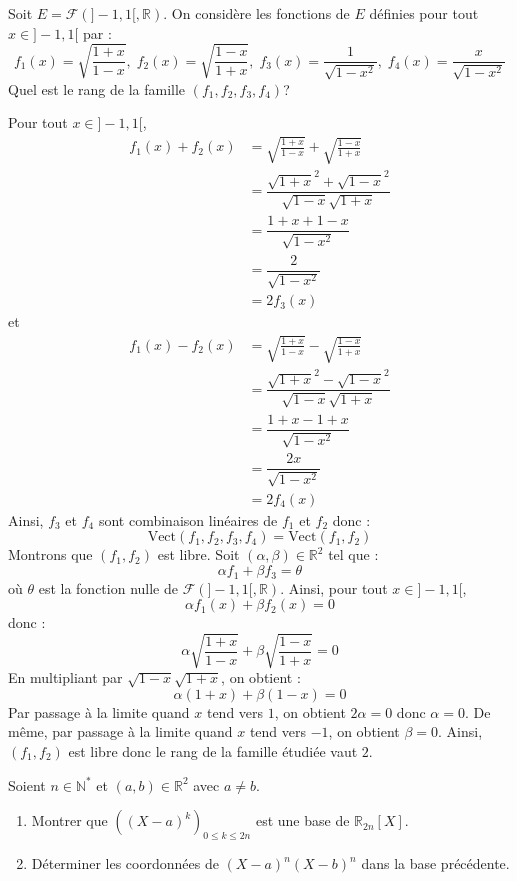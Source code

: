 \documentclass[a4paper,10pt]{report}
\begin{document}
\begin{Exercice}{} Soit $E = \mathcal{F}(]-1,1[, \mathbb{R})$. On considère les fonctions de $E$ définies pour tout $x \in ]-1,1[$ par : 
    \[
    f_1(x) = \sqrt {\frac{1 + x}{1 - x}} , \; f_2(x) = \sqrt {\frac{1 - x}{1 + x}} , \; f_3(x) = \frac{1}{\sqrt {1 - x^2}}, \; f_4(x) = \frac{x}{\sqrt {1 - x^2}}
    \]
Quel est le rang de la famille $(f_1 ,f_2 ,f_3 ,f_4)$?
\end{Exercice}

\corr Pour tout $x \in ]-1,1[$,
\begin{align*}
 f_1(x)+f_2(x) & = \sqrt {\frac{1 + x}{1 - x}} + \sqrt {\frac{1 - x}{1 + x}}  \\
 & = \dfrac{\sqrt{1+x}^2 + \sqrt{1-x}^2}{\sqrt{1-x}\sqrt{1+x}} \\
 & = \dfrac{1+x+1-x}{\sqrt{1-x^2}}\\
 & = \dfrac{2}{\sqrt{1-x^2}}\\
 & = 2 f_3(x)
 \end{align*}
et 
\begin{align*}
 f_1(x)-f_2(x) & = \sqrt {\frac{1 + x}{1 - x}} - \sqrt {\frac{1 - x}{1 + x}}  \\
 & = \dfrac{\sqrt{1+x}^2 - \sqrt{1-x}^2}{\sqrt{1-x}\sqrt{1+x}} \\
 & = \dfrac{1+x-1+x}{\sqrt{1-x^2}}\\
 & = \dfrac{2x}{\sqrt{1-x^2}}\\
 & = 2 f_4(x)
 \end{align*}
 Ainsi, $f_3$ et $f_4$ sont combinaison linéaires de $f_1$ et $f_2$ donc :
 $$ \textrm{Vect}(f_1,f_2,f_3,f_4) = \textrm{Vect}(f_1,f_2)$$
Montrons que $(f_1,f_2)$ est libre. Soit $(\alpha, \beta) \in \mathbb{R}^2$ tel que :
$$ \alpha f_1 + \beta f_3 = \theta$$
où $\theta$ est la fonction nulle de $\mathcal{F}(]-1,1[, \mathbb{R})$. Ainsi, pour tout $x \in ]-1,1[$,
$$ \alpha f_1(x)+ \beta f_2(x) = 0$$
donc :
$$ \alpha \sqrt {\frac{1 + x}{1 - x}} +  \beta \sqrt {\frac{1 - x}{1 + x}} = 0$$
En multipliant par $\sqrt{1-x} \sqrt{1+x}$, on obtient :
$$ \alpha (1+x) + \beta (1-x) = 0$$
Par passage à la limite quand $x$ tend vers $1$, on obtient $2\alpha=0$ donc $\alpha=0$. De même, par passage à la limite quand $x$ tend vers $-1$, on obtient $\beta=0$. Ainsi, $(f_1,f_2)$ est libre donc le rang de la famille étudiée vaut $2$.


\begin{Exercice}{} Soient $n \in \mathbb{N}^*$ et $(a,b) \in \mathbb{R}^2$ avec $a \neq b$.
\begin{enumerate}
\item Montrer que $((X-a)^k)_{0 \leq k \leq 2n}$ est une base de $\mathbb{R}_{2n}[X]$.
\item Déterminer les coordonnées de $(X-a)^n(X-b)^n$ dans la base précédente.
\end{enumerate}
\end{Exercice} 
\end{document}
